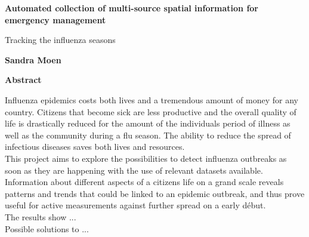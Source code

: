 \thispagestyle{plain}
\begin{center}
	\Large
	\textbf{Automated collection of multi-source spatial information for emergency management}
	
	\vspace{0.4cm}
	\large
	Tracking the influenza seasons
	
	\vspace{0.4cm}
	\textbf{Sandra Moen}
	
	\vspace{0.9cm}
	\textbf{Abstract}
\end{center}
Influenza epidemics costs both lives and a tremendous amount of money for any country. Citizens that become sick are less productive and the overall quality of life is drastically reduced for the amount of the individuals period of illness as well as the community during a flu season. The ability to reduce the spread of infectious diseases saves both lives and resources. \\

This project aims to explore the possibilities to detect influenza outbreaks as soon as they are happening with the use of relevant datasets available. Information about different aspects of a citizens life on a grand scale reveals patterns and trends that could be linked to an epidemic outbreak, and thus prove useful for active measurements against further spread on a early début. \\

The results show ...\\

Possible solutions to ...